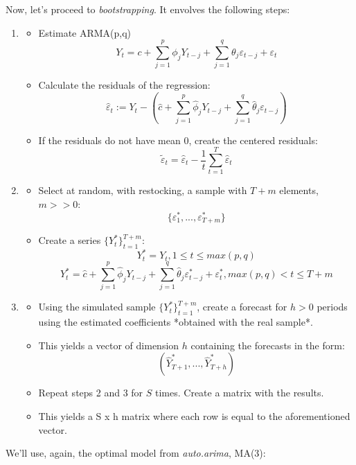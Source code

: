 \documentclass[]{article}
\begin{document}
Now, let's proceed to \emph{bootstrapping}. It envolves the following
steps:

\begin{enumerate}
\item \begin{itemize}
\item Estimate ARMA(p,q)
$$ Y_t = c + \sum_{j=1}^p \phi_j Y_{t-j} + \sum_{j=1}^q \theta_j \varepsilon_{t-j} + \varepsilon_t$$

\item Calculate the residuals of the regression:
$$ \hat{\varepsilon}_t := Y_t - (\hat{c} + \sum_{j=1}^p \hat{\phi}_j Y_{t-j} + \sum_{j=1}^q \hat{\theta}_j \varepsilon_{t-j})$$

\item If the residuals do not have mean 0, create the centered residuals:
$$ \tilde{\varepsilon}_t = \hat{\varepsilon}_t - \frac{1}{t} \sum_{t=1}^T \hat{\varepsilon}_t$$
\end{itemize}

\item \begin{itemize}
\item Select at random, with restocking, a sample with $T + m$ elements, $m >> 0$:
$$\{\varepsilon^*_1, ..., \varepsilon^*_{T+m}\}$$
\item Create a series $\{Y^*_t\}_{t=1}^{T+m}$:
$$ Y_t^* = Y_t, 1 \leq t \leq max(p,q) $$
$$ Y_t^* = \hat{c} + \sum_{j=1}^p \hat{\phi}_j Y_{t-j} + \sum_{j=1}^q \hat{\theta}_j \varepsilon_{t-j}^* + \varepsilon_t^*, max(p,q) < t \leq T + m $$
\end{itemize}
\item \begin{itemize}
\item Using the simulated sample $\{Y^*_t\}_{t=1}^{T+m}$, create a forecast for $h >0$ periods using the estimated coefficients *obtained with the real sample*.
\item This yields a vector of dimension $h$ containing the forecasts in the form:
$$(\hat{Y}^*_{T+1}, ..., \hat{Y}^*_{T+h})$$ 
\item Repeat steps 2 and 3 for $S$ times. Create a matrix with the results.

\item This yields a S x h matrix where each row is equal to the aforementioned vector.
\end{itemize}
\end{enumerate}

We'll use, again, the optimal model from \emph{auto.arima}, MA(3):
\end{document}
